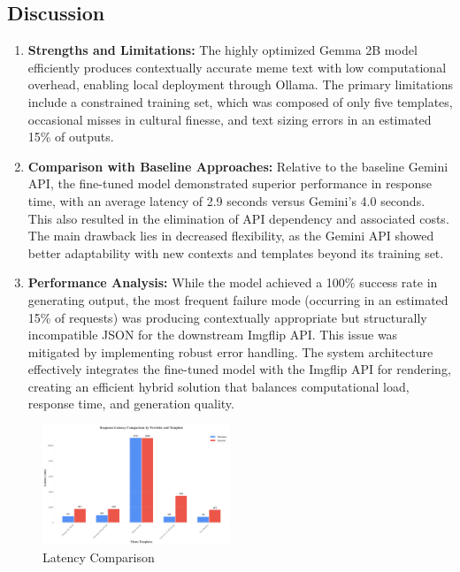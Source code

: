 \documentclass[conference]{IEEEtran}
\begin{document}
\subsection{Discussion}
\begin{enumerate}
    \item \textbf{Strengths and Limitations:} The highly optimized Gemma 2B model efficiently produces contextually accurate meme text with low computational overhead, enabling local deployment through Ollama. The primary limitations include a constrained training set, which was composed of only five templates, occasional misses in cultural finesse, and text sizing errors in an estimated 15\% of outputs.
    \item \textbf{Comparison with Baseline Approaches:} Relative to the baseline Gemini API, the fine-tuned model demonstrated superior performance in response time, with an average latency of 2.9 seconds versus Gemini's 4.0 seconds. This also resulted in the elimination of API dependency and associated costs. The main drawback lies in decreased flexibility, as the Gemini API showed better adaptability with new contexts and templates beyond its training set.
    \item \textbf{Performance Analysis:} While the model achieved a 100\% success rate in generating output, the most frequent failure mode (occurring in an estimated 15\% of requests) was producing contextually appropriate but structurally incompatible JSON for the downstream Imgflip API. This issue was mitigated by implementing robust error handling. The system architecture effectively integrates the fine-tuned model with the Imgflip API for rendering, creating an efficient hybrid solution that balances computational load, response time, and generation quality.
\end{enumerate}

\begin{figure}[H]
\centering
\includegraphics[width=0.5\textwidth]{Assets/graphs/latency_comparison.png}
\caption{Latency Comparison}
\label{fig:latency-comparison}
\end{figure}
\end{document}
